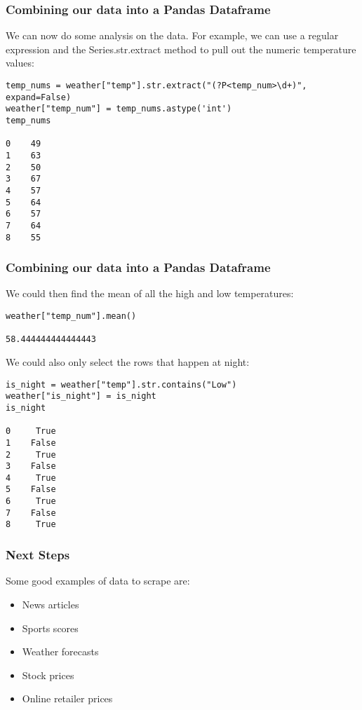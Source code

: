 \begin{frame}[fragile]\frametitle{Combining our data into a Pandas Dataframe}
We can now do some analysis on the data. For example, we can use a regular expression and the Series.str.extract method to pull out the numeric temperature values:

\begin{lstlisting}
temp_nums = weather["temp"].str.extract("(?P<temp_num>\d+)", expand=False)
weather["temp_num"] = temp_nums.astype('int')
temp_nums

0    49
1    63
2    50
3    67
4    57
5    64
6    57
7    64
8    55
\end{lstlisting}
\end{frame}

\begin{frame}[fragile]\frametitle{Combining our data into a Pandas Dataframe}
We could then find the mean of all the high and low temperatures:

\begin{lstlisting}
weather["temp_num"].mean()

58.444444444444443
\end{lstlisting}
We could also only select the rows that happen at night:
\begin{lstlisting}
is_night = weather["temp"].str.contains("Low")
weather["is_night"] = is_night
is_night

0     True
1    False
2     True
3    False
4     True
5    False
6     True
7    False
8     True
\end{lstlisting}
\end{frame}

\begin{frame}[fragile]\frametitle{Next Steps}
Some good examples of data to scrape are:
     \begin{itemize}
    \item        News articles
    \item         Sports scores
    \item         Weather forecasts
    \item         Stock prices
    \item         Online retailer prices


	    \end{itemize}
\end{frame}















